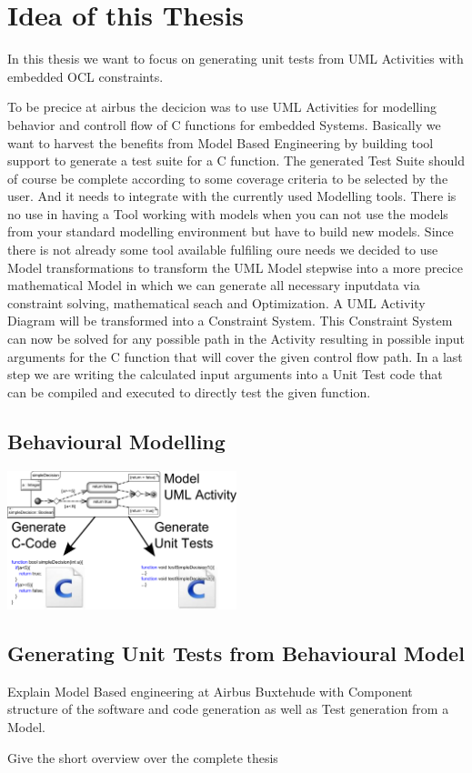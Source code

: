 \section{Idea of this Thesis}
In this thesis we want to focus on generating unit tests from UML Activities with embedded OCL constraints.



 To be precice at airbus the decicion was to use UML Activities for modelling behavior and controll flow of C functions for embedded Systems. Basically we want to harvest the benefits from Model Based Engineering by building tool support to generate a test suite for a C function. The generated Test Suite should of course be complete according to some coverage criteria to be selected by the user. And it needs to integrate with the currently used Modelling tools. There is no use in having a Tool working with models when you can not use the models from your standard modelling environment but have to build new models. Since there is not already some tool available fulfiling oure needs we decided to use Model transformations to transform the UML Model stepwise into a more precice mathematical Model in which we can generate all necessary inputdata via constraint solving, mathematical seach and Optimization. A UML Activity Diagram will be transformed into a Constraint System. This Constraint System can now be solved for any possible path in the Activity resulting in possible input arguments for the C function that will cover the given control flow path. In a last step we are writing the calculated input arguments into a Unit Test code that can be compiled and executed to directly test the given function. 
\subsection{Behavioural Modelling}
\includegraphics[width=0.5\textwidth]{./pics/Activity2Code+Tests.png}
\subsection{Generating Unit Tests from Behavioural Model}
Explain Model Based engineering at Airbus Buxtehude with Component structure of the software and code generation as well as Test generation from a Model.

Give the short overview over the complete thesis